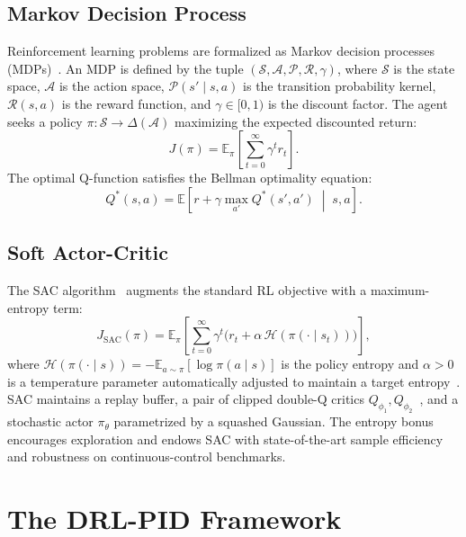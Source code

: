 \documentclass[conference,a4paper]{IEEEtran}[2015/08/26]
\newcommand{\E}{\mathbb{E}}
\newcommand{\calS}{\mathcal{S}}
\newcommand{\calA}{\mathcal{A}}
\newcommand{\calH}{\mathcal{H}}
\begin{document}
\subsection{Markov Decision Process}

Reinforcement learning problems are formalized as Markov decision
processes (MDPs)~\cite{Bellman1957,Sutton2018}. An MDP is defined by
the tuple $(\calS, \calA, \mathcal{P}, \mathcal{R}, \gamma)$, where
$\calS$ is the state space, $\calA$ is the action space,
$\mathcal{P}(s' \mid s, a)$ is the transition probability kernel,
$\mathcal{R}(s, a)$ is the reward function, and $\gamma \in [0, 1)$ is
the discount factor. The agent seeks a policy
$\pi : \calS \to \Delta(\calA)$ maximizing the expected discounted
return:
\begin{equation}
  J(\pi) = \E_\pi\!\left[\sum_{t=0}^{\infty} \gamma^t r_t\right].
  \label{eq:return}
\end{equation}
The optimal Q-function satisfies the Bellman optimality equation:
\begin{equation}
  Q^*(s, a) = \E\!\left[r + \gamma \max_{a'} Q^*(s', a') \;\middle|\; s, a\right].
  \label{eq:bellman}
\end{equation}

\subsection{Soft Actor-Critic}

The SAC algorithm~\cite{Haarnoja2018} augments the standard RL objective
with a maximum-entropy term:
\begin{equation}
  J_{\text{SAC}}(\pi) =
    \E_\pi\!\left[\sum_{t=0}^{\infty} \gamma^t
      \bigl(r_t + \alpha\,\calH\!\left(\pi(\cdot \mid s_t)\right)\bigr)
    \right],
  \label{eq:sac}
\end{equation}
where $\calH(\pi(\cdot \mid s)) = -\E_{a \sim \pi}[\log \pi(a \mid s)]$
is the policy entropy and $\alpha > 0$ is a temperature parameter
automatically adjusted to maintain a target entropy~\cite{Haarnoja2018}.
SAC maintains a replay buffer, a pair of clipped double-Q critics
$Q_{\phi_1}, Q_{\phi_2}$~\cite{Fujimoto2018}, and a stochastic actor
$\pi_\theta$ parametrized by a squashed Gaussian. The entropy bonus
encourages exploration and endows SAC with state-of-the-art sample
efficiency and robustness on continuous-control benchmarks.

\section{The DRL-PID Framework}
\label{sec:method}
\end{document}
